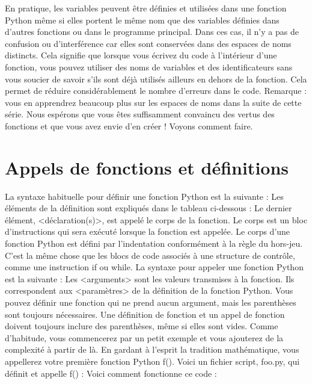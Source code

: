 En pratique, les variables peuvent être définies et utilisées dans une fonction Python même si elles portent le même nom que des variables définies dans d'autres fonctions ou dans le programme principal. Dans ces cas, il n'y a pas de confusion ou d'interférence car elles sont conservées dans des espaces de noms distincts.
Cela signifie que lorsque vous écrivez du code à l'intérieur d'une fonction, vous pouvez utiliser des noms de variables et des identificateurs sans vous soucier de savoir s'ils sont déjà utilisés ailleurs en dehors de la fonction.  Cela permet de réduire considérablement le nombre d'erreurs dans le code.
Remarque : vous en apprendrez beaucoup plus sur les espaces de noms dans la suite de cette série.
Nous espérons que vous êtes suffisamment convaincu des vertus des fonctions et que vous avez envie d'en créer !  Voyons comment faire.
\section{Appels de fonctions et définitions}
La syntaxe habituelle pour définir une fonction Python est la suivante :
Les éléments de la définition sont expliqués dans le tableau ci-dessous :
Le dernier élément, <déclaration(s)>, est appelé le corps de la fonction.  Le corps est un bloc d'instructions qui sera exécuté lorsque la fonction est appelée.  Le corps d'une fonction Python est défini par l'indentation conformément à la règle du hors-jeu. C'est la même chose que les blocs de code associés à une structure de contrôle, comme une instruction if ou while.
La syntaxe pour appeler une fonction Python est la suivante :
Les <arguments> sont les valeurs transmises à la fonction. Ils correspondent aux <paramètres> de la définition de la fonction Python.  Vous pouvez définir une fonction qui ne prend aucun argument, mais les parenthèses sont toujours nécessaires.  Une définition de fonction et un appel de fonction doivent toujours inclure des parenthèses, même si elles sont vides.
Comme d'habitude, vous commencerez par un petit exemple et vous ajouterez de la complexité à partir de là.  En gardant à l'esprit la tradition mathématique, vous appellerez votre première fonction Python f().  Voici un fichier script, foo.py, qui définit et appelle f() :
Voici comment fonctionne ce code :
